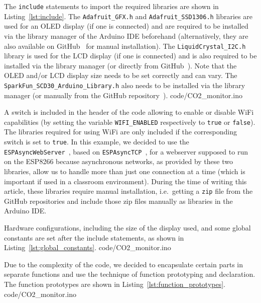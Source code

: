 \documentclass[12pt,a4paper]{article}
\begin{document}
The \texttt{include} statements to import the required libraries are shown in Listing~\ref{lst:include}. The \texttt{Adafruit\_GFX.h} and \texttt{Adafruit\_SSD1306.h} libraries are used for an OLED display (if one is connected) and are required to be installed via the library manager of the Arduino IDE beforehand (alternatively, they are also available on GitHub~\cite{ADAFRUIT2020A} for manual installation). The \texttt{LiquidCrystal\_I2C.h} library is used for the LCD display (if one is connected) and is also required to be installed via the library manager (or directly from GitHub~\cite{RICKMAN2020}). Note that the OLED and/or LCD display size needs to be set correctly and can vary. The \texttt{SparkFun\_SCD30\_Arduino\_Library.h} also needs to be installed via the library manager (or manually from the GitHub repository~\cite{SPARKFUN2020}).
%
{code/CO2_monitor.ino} 

A switch is included in the header of the code allowing to enable or disable WiFi capabilities (by setting the variable \texttt{WIFI\_ENABLED} respectively to \texttt{true} or \texttt{false}). The libraries required for using WiFi are only included if the corresponding switch is set to \texttt{true}. In this example, we decided to use the \texttt{ESPAsyncWebServer}~\cite{MENODEV2020B}, based on \texttt{ESPAsyncTCP}~\cite{MENODEV2020A}, for a webserver supposed to run on the ESP8266 because asynchronous networks, as provided by these two libraries, allow us to handle more than just one connection at a time (which is important if used in a classroom environment). During the time of writing this article, these libraries require manual installation, i.e.\ getting a \texttt{zip} file from the GitHub repositories and include those zip files manually as libraries in the Arduino IDE.

Hardware configurations, including the size of the display used, and some global constants are set after the include statements, as shown in Listing~\ref{lst:global_constants}. 
%
{code/CO2_monitor.ino} 

Due to the complexity of the code, we decided to encapsulate certain parts in separate functions and use the technique of function prototyping and declaration. The function prototypes are shown in Listing~\ref{lst:function_prototypes}.
%
{code/CO2_monitor.ino} 
\end{document}
